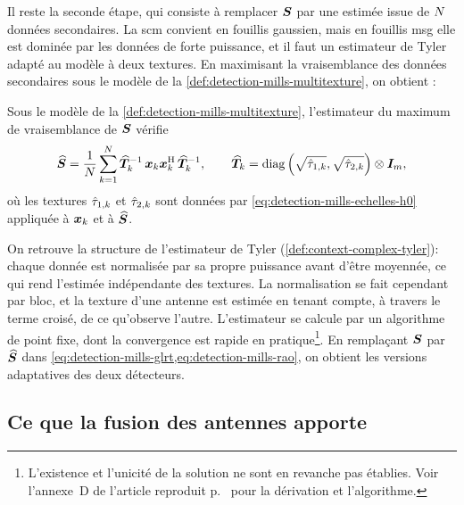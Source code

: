 Il reste la seconde étape, qui consiste à remplacer $\boldsymbol{S}$ par une estimée issue de $N$ données secondaires. La scm convient en fouillis gaussien, mais en fouillis msg elle est dominée par les données de forte puissance, et il faut un estimateur de Tyler adapté au modèle à deux textures. En maximisant la vraisemblance des données secondaires sous le modèle de la \cref{def:detection-mills-multitexture}, on obtient :

\begin{proposition}
\label{prop:detection-mills-tyler}
  Sous le modèle de la \cref{def:detection-mills-multitexture}, l'estimateur du maximum de vraisemblance de $\boldsymbol{S}$ vérifie
  \begin{equation}
    \widehat{\boldsymbol{S}}
    =
    \frac{1}{N}\sum_{k=1}^{N}
    {\widehat{\boldsymbol{T}}_k}^{-1}\,\boldsymbol{x}_k\boldsymbol{x}_k^{\mathrm{H}}\,{\widehat{\boldsymbol{T}}_k}^{-1},
    \qquad
    \widehat{\boldsymbol{T}}_k = \operatorname{\operatorname{diag}}\left(\sqrt{\hat{\tau}_{1,k}},\sqrt{\hat{\tau}_{2,k}}\right)\otimes\boldsymbol{I}_{m},
    \label{eq:detection-mills-tyler}
  \end{equation}
  où les textures $\hat{\tau}_{1,k}$ et $\hat{\tau}_{2,k}$ sont données par \cref{eq:detection-mills-echelles-h0} appliquée à $\boldsymbol{x}_k$ et à $\widehat{\boldsymbol{S}}$.
\end{proposition}

On retrouve la structure de l'estimateur de Tyler (\cref{def:context-complex-tyler}): chaque donnée est normalisée par sa propre puissance avant d'être moyennée, ce qui rend l'estimée indépendante des textures. La normalisation se fait cependant par bloc, et la texture d'une antenne est estimée en tenant compte, à travers le terme croisé, de ce qu'observe l'autre. L'estimateur se calcule par un algorithme de point fixe, dont la convergence est rapide en pratique\footnote{L'existence et l'unicité de la solution ne sont en revanche pas établies. Voir l'annexe~D de l'article reproduit p.~ pour la dérivation et l'algorithme.}. En remplaçant $\boldsymbol{S}$ par $\widehat{\boldsymbol{S}}$ dans \cref{eq:detection-mills-glrt,eq:detection-mills-rao}, on obtient les versions adaptatives des deux détecteurs.

\subsection{Ce que la fusion des antennes apporte}
\label{subsec:detection-mills-perf}

